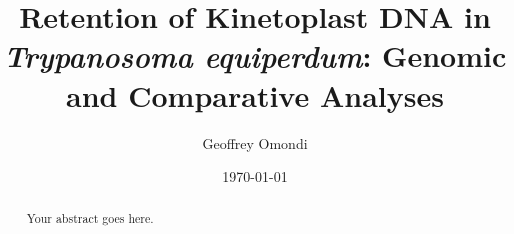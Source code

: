 \documentclass[12pt]{report}
\begin{document}
\title{Retention of Kinetoplast DNA in \textit{Trypanosoma equiperdum}: Genomic and Comparative Analyses}

\author{Geoffrey Omondi}

\date{\today}

\maketitle


\begin{abstract}

Your abstract goes here.

\end{abstract}














\end{document}
